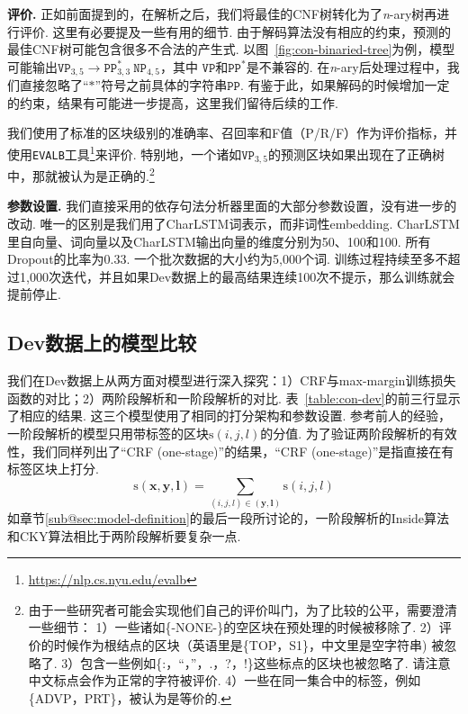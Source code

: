 \noindent\textbf{评价.}
正如前面提到的，在解析之后，我们将最佳的CNF树转化为了\textit{n}-ary树再进行评价.
这里有必要提及一些有用的细节.
由于解码算法没有相应的约束，预测的最佳CNF树可能包含很多不合法的产生式.
以图~\ref{fig:con-binaried-tree}为例，模型可能输出$\texttt{VP}_{3,5} \rightarrow \texttt{PP}^{\ast}_{3,3} ~ \texttt{NP}_{4,5}$，其中 $\texttt{VP}$和$\texttt{PP}^{\ast}$是不兼容的.
在\textit{n}-ary后处理过程中，我们直接忽略了``$\mathtt{\ast}$''符号之前具体的字符串$\texttt{PP}$.
有鉴于此，如果解码的时候增加一定的约束，结果有可能进一步提高，这里我们留待后续的工作.

我们使用了标准的区块级别的准确率、召回率和F值（P/R/F）作为评价指标，并使用\texttt{EVALB}工具\footnote{\url{https://nlp.cs.nyu.edu/evalb}}来评价.
特别地，一个诸如$\texttt{VP}_{3,5}$的预测区块如果出现在了正确树中，那就被认为是正确的.\footnote{
    由于一些研究者可能会实现他们自己的评价叫门，为了比较的公平，需要澄清一些细节：
    1）一些诸如\{-NONE-\}的空区块在预处理的时候被移除了.
    2）评价的时候作为根结点的区块（英语里是\{TOP，S1\}，中文里是空字符串) 被忽略了.
    3）包含一些例如\{:，``，''，.，?，!\}这些标点的区块也被忽略了. 请注意中文标点会作为正常的字符被评价.
    4）一些在同一集合中的标签，例如\{ADVP，PRT\}，被认为是等价的.}

\noindent\textbf{参数设置.}
我们直接采用\cite{Timothy-d17-biaffine}的依存句法分析器里面的大部分参数设置，没有进一步的改动.
唯一的区别是我们用了CharLSTM词表示，而非词性embedding.
CharLSTM里自向量、词向量以及CharLSTM输出向量的维度分别为50、100和100.
所有Dropout的比率为0.33.
一个批次数据的大小约为5,000个词.
训练过程持续至多不超过1,000次迭代，并且如果Dev数据上的最高结果连续100次不提示，那么训练就会提前停止.



\subsection{Dev数据上的模型比较}

我们在Dev数据上从两方面对模型进行深入探究：1）CRF与max-margin训练损失函数的对比；2）两阶段解析和一阶段解析的对比.
表~\ref{table:con-dev}的前三行显示了相应的结果.
这三个模型使用了相同的打分架构和参数设置.
参考前人的经验\cite{stern-etal-2017-minimal}，一阶段解析的模型只用带标签的区块$\mathrm{s}(i,j,l)$的分值.
为了验证两阶段解析的有效性，我们同样列出了``CRF (one-stage)''的结果，``CRF (one-stage)''是指直接在有标签区块上打分.
\begin{equation} \label{eq:tree-label-score}
    \mathrm{s}(\boldsymbol{x},\boldsymbol{y},\boldsymbol{l}) =
    \sum_{(i,j,l) \in (\boldsymbol{y}, \boldsymbol{l})} \mathrm{s}(i,j,l)
\end{equation}
如章节\ref{sub@sec:model-definition}的最后一段所讨论的，一阶段解析的Inside算法和CKY算法相比于两阶段解析要复杂一点.

